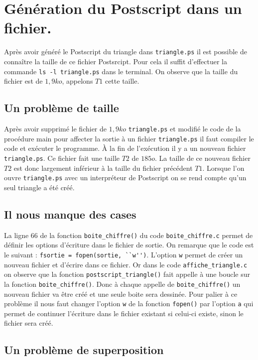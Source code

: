 \section{Génération du Postscript dans un fichier.}

Après avoir généré le Postscript du triangle dans \verb!triangle.ps! il est possible de connaître la taille de ce fichier Postsrcipt. Pour cela il suffit d'effectuer la commande \verb!ls -l triangle.ps! dans le terminal.
On observe que la taille du fichier est de $1,9ko$, appelons $T1$ cette taille.

\subsection{Un problème de taille}

Après avoir supprimé le fichier de $1,9ko$ \verb!triangle.ps! et modifié le code de la procédure main pour affecter la sortie à un fichier \verb!triangle.ps! il faut compiler le code et exécuter le programme.
À la fin de l'exécution il y a un nouveau fichier \verb!triangle.ps!.
Ce fichier fait une taille $T2$ de $185o$. 
La taille de ce nouveau fichier $T2$ est donc largement inférieur à la taille du fichier précédent $T1$.
Lorsque l'on ouvre \verb!triangle.ps! avec un interpréteur de Postscript on se rend compte qu'un seul triangle a été créé.

\subsection{Il nous manque des cases}
\label{sub:cases}

La ligne $66$ de la fonction \verb!boite_chiffre()! du code \verb!boite_chiffre.c! permet de définir les options d'écriture dans le fichier de sortie.
On remarque que le code est le suivant : \verb!fsortie = fopen(sortie, ``w'')!.
L'option \verb!w! permet de créer un nouveau fichier et d'écrire dans ce fichier.
Or dans le code \verb!affiche_triangle.c! on observe que la fonction \verb!postscript_triangle()! fait appelle à une boucle sur la fonction \verb!boite_chiffre()!.
Donc à chaque appelle de \verb!boite_chiffre()! un nouveau fichier va être créé et une seule boite sera dessinée.
Pour palier à ce problème il nous faut changer l'option \verb!w! de la fonction \verb!fopen()! par l'option \verb!a! qui permet de continuer l'écriture dans le fichier existant si celui-ci existe, sinon le fichier sera créé.

\subsection{Un problème de superposition}

